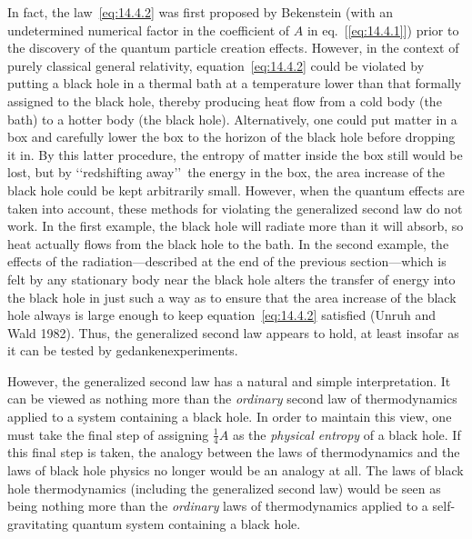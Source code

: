 In fact, the law~\eqref{eq:14.4.2} was first proposed by Bekenstein (with an
undetermined numerical factor in the coefficient of \(A\) in
eq.~[\ref{eq:14.4.1}]) prior to the discovery of the quantum particle creation
effects. However, in the context of purely classical general relativity,
equation~\eqref{eq:14.4.2} could be violated by putting a black hole in a thermal
bath at a temperature lower than that formally assigned to the black hole, thereby
producing heat flow from a cold body (the bath) to a hotter body (the black hole).
Alternatively, one could put matter in a box and carefully lower the box to the
horizon of the black hole before dropping it in. By this latter procedure, the entropy
of matter inside the box still would be lost, but by \lq\lq redshifting away\rq\rq\
the energy in the box, the area increase of the black hole could be kept arbitrarily
small. However, when the quantum effects are taken into account, these methods for
violating the generalized second law do not work. In the first example, the black
hole will radiate more than it will absorb, so heat actually flows from the black hole
to the bath. In the second example, the effects of the radiation---described at the
end of the previous section---which is felt by any stationary body near the black hole
alters the transfer of energy into the black hole in just such a way as to ensure that
the area increase of the black hole always is large enough to keep
equation~\eqref{eq:14.4.2} satisfied (Unruh and Wald 1982). Thus, the generalized
second law appears to hold, at least insofar as it can be tested by
gedankenexperiments.

However, the generalized second law has a natural and simple interpretation. It can
be viewed as nothing more than the \emph{ordinary} second law of thermodynamics
applied to a system containing a black hole. In order to maintain this view, one must
take the final step of assigning \(\frac14A\) as the \emph{physical entropy} of a
black hole. If this final step is taken, the analogy between the laws of thermodynamics
and the laws of black hole physics no longer would be an analogy at all. The laws of
black hole thermodynamics (including the generalized second law) would be seen as
being nothing more than the \emph{ordinary} laws of thermodynamics applied to a
self-gravitating quantum system containing a black hole.

